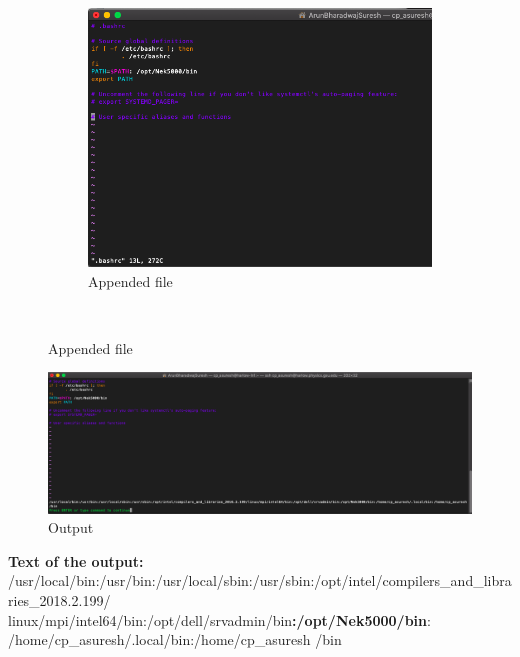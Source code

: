 \documentclass[12pt]{article}
\begin{document}
\begin{figure}[h]
\begin{subfigure}[h]{0.450\textwidth}
			\includegraphics[width=\textwidth]{vim.png}
			\caption{Appended file}
		\end{subfigure}\\ 
\end{figure}
\newpage
\begin{figure}[h]
	\centering
	\includegraphics[width=\textwidth]{pathoutput.png}
	\caption{Output}
\end{figure}
\noindent \textbf{Text of the output:}\\ /usr/local/bin:/usr/bin:/usr/local/sbin:/usr/sbin:/opt/intel/compilers\_and\_libraries\_2018.2.199/\\linux/mpi/intel64/bin:/opt/dell/srvadmin/bin\textbf{:/opt/Nek5000/bin}:\\/home/cp\_asuresh/.local/bin:/home/cp\_asuresh
/bin
\end{document}
